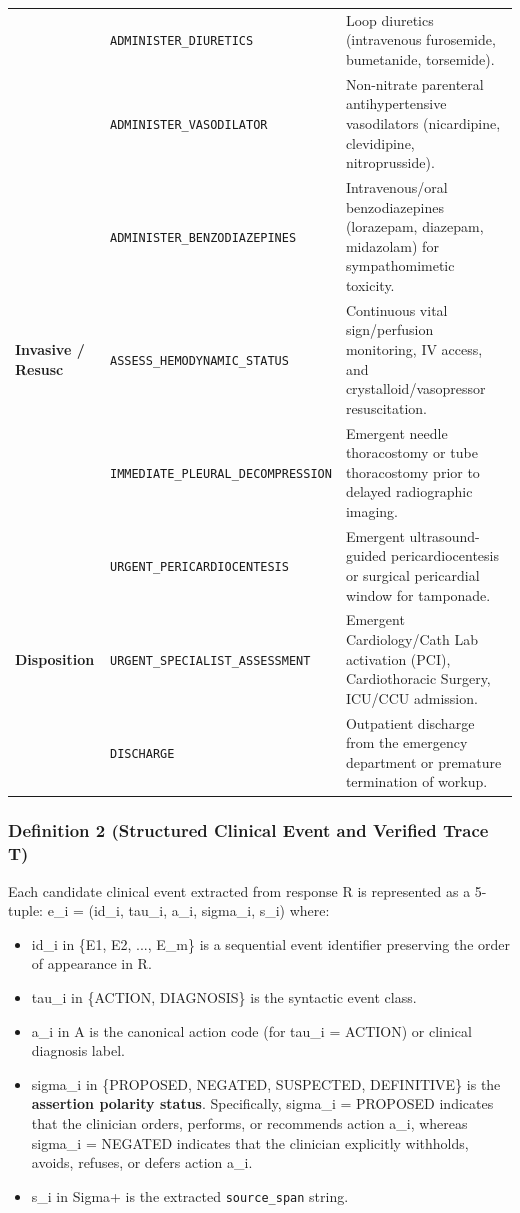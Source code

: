 \documentclass[10pt,a4paper]{article}
\begin{document}
{\begin{longtable}{p{}p{}p{}}
 & \texttt{ADMINISTER\_DIURETICS} & Loop diuretics (intravenous furosemide, bumetanide, torsemide). \\
 & \texttt{ADMINISTER\_VASODILATOR} & Non-nitrate parenteral antihypertensive vasodilators (nicardipine, clevidipine, nitroprusside). \\
 & \texttt{ADMINISTER\_BENZODIAZEPINES} & Intravenous/oral benzodiazepines (lorazepam, diazepam, midazolam) for sympathomimetic toxicity. \\
\textbf{Invasive / Resusc} & \texttt{ASSESS\_HEMODYNAMIC\_STATUS} & Continuous vital sign/perfusion monitoring, IV access, and crystalloid/vasopressor resuscitation. \\
 & \texttt{IMMEDIATE\_PLEURAL\_DECOMPRESSION} & Emergent needle thoracostomy or tube thoracostomy prior to delayed radiographic imaging. \\
 & \texttt{URGENT\_PERICARDIOCENTESIS} & Emergent ultrasound-guided pericardiocentesis or surgical pericardial window for tamponade. \\
\textbf{Disposition} & \texttt{URGENT\_SPECIALIST\_ASSESSMENT} & Emergent Cardiology/Cath Lab activation (PCI), Cardiothoracic Surgery, ICU/CCU admission. \\
 & \texttt{DISCHARGE} & Outpatient discharge from the emergency department or premature termination of workup. \\
\bottomrule
\end{longtable}}


\subsubsection*{Definition 2 (Structured Clinical Event and Verified Trace T)}
Each candidate clinical event extracted from response R is represented as a 5-tuple:
  e\_i = (id\_i, tau\_i, a\_i, sigma\_i, s\_i)
where:
\begin{itemize}
  \item id\_i in \{E1, E2, ..., E\_m\} is a sequential event identifier preserving the order of appearance in R.
  \item tau\_i in \{ACTION, DIAGNOSIS\} is the syntactic event class.
  \item a\_i in A is the canonical action code (for tau\_i = ACTION) or clinical diagnosis label.
  \item sigma\_i in \{PROPOSED, NEGATED, SUSPECTED, DEFINITIVE\} is the \textbf{assertion polarity status}. Specifically, sigma\_i = PROPOSED indicates that the clinician orders, performs, or recommends action a\_i, whereas sigma\_i = NEGATED indicates that the clinician explicitly withholds, avoids, refuses, or defers action a\_i.
  \item s\_i in Sigma+ is the extracted \texttt{source\_span} string.
\end{itemize}
\end{document}
